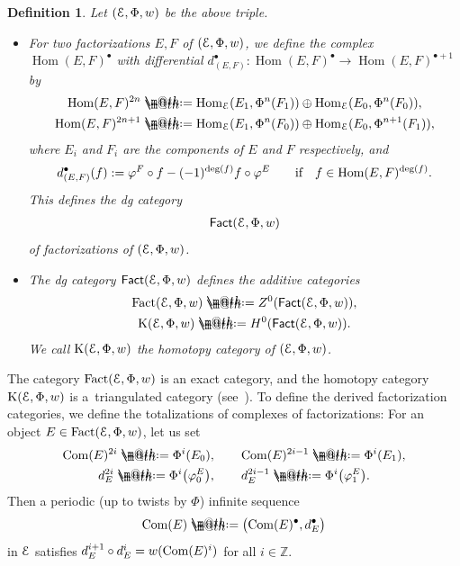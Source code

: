 \documentclass[pdftex]{sigma}%
\makeatletter
\newtheorem{dfn}{Definition}[section]
\newcommand*{\defeq}{\mathrel{\rlap{%
 \raisebox{0.3ex}{$\m@th\cdot$}}%
 \raisebox{-0.3ex}{$\m@th\cdot$}}%
 =}
\numberwithin{equation}{section}
\newcommand{\Fact}{\operatorname{Fact}}
\newcommand{\dgFact}{\operatorname{\sf{Fact}}}
\newcommand{\Hom}{\operatorname{Hom}}
\newcommand{\K}{\operatorname{K}}
\newcommand{\bZ}{\mathbb{Z}}
\newcommand{\scrE}{\EuScript{E}}
\makeatother
\begin{document}
\begin{dfn}
Let $(\scrE,\Phi,w)$ be the above triple.
\begin{itemize}\itemsep=0pt
\item[$1.$] For two factorizations $E,F$ of $(\scrE,\Phi,w)$, we define the complex $\Hom(E,F)^{\bullet}$ with differential $d^{\bullet}_{(E,F)}\colon\Hom(E,F)^{\bullet}\to\Hom(E,F)^{\bullet+1}$ by
\begin{gather*}
{\rm Hom}(E,F)^{2n}\defeq{\rm Hom}_{\scrE}(E_1,\Phi^n(F_1))\oplus{\rm Hom}_{\scrE}(E_0,\Phi^n(F_0)),
\\
{\rm Hom}(E,F)^{2n+1}\defeq{\rm Hom}_{\scrE}(E_1,\Phi^{n}(F_0))\oplus{\rm Hom}_{\scrE}(E_0,\Phi^{n+1}(F_1)),
\end{gather*}
where $E_i$ and $F_i$ are the components of $E$ and $F$ respectively, and
\begin{gather*}
d^{\bullet}_{(E,F)}(f):=\varphi^F\circ f-(-1)^{{\rm deg}(f)}f\circ \varphi^E
\qquad\text{if}\quad f\in{\rm Hom}(E,F)^{{\rm deg}(f)}.
\end{gather*}
This defines the dg category
\begin{gather*}
\dgFact(\scrE,\Phi,w)
\end{gather*}
of factorizations of $(\scrE,\Phi,w)$.

\item[$2.$] The dg category $\dgFact(\scrE,\Phi,w)$ defines the additive categories
\begin{gather*}
\Fact(\scrE,\Phi,w)\defeq Z^0(\dgFact(\scrE,\Phi,w)),
\\
\K(\scrE,\Phi,w)\defeq H^0(\dgFact(\scrE,\Phi,w)).
\end{gather*}
We call $\K(\scrE,\Phi,w)$ the {\it homotopy category} of $(\scrE,\Phi,w)$.
\end{itemize}
\end{dfn}

The category $\Fact(\scrE,\Phi,w)$ is an exact category, and the homotopy category $\K(\scrE,\Phi,w)$ is a~triangulated category (see~\cite[Propositions~3.5 and~3.9]{H1}). To define the derived factorization categories, we define the totalizations of complexes of factorizations: For an object $E\in \Fact(\scrE,\Phi,w)$, let us set
\begin{gather*}
{\rm Com}(E)^{2i}\defeq\Phi^i(E_0), \qquad {\rm Com}(E)^{2i-1}\defeq\Phi^i(E_1),
\\
d_E^{2i}\defeq\Phi^i\big(\varphi_0^E\big),\qquad d_E^{2i-1}\defeq\Phi^i\big(\varphi_1^E\big).
\end{gather*}
Then a periodic (up to twists by $\Phi$) infinite sequence
\begin{gather*}
{\rm Com}(E)\defeq\big({\rm Com}(E)^{\bullet}, d_E^{\bullet}\big)
\end{gather*}
 in $\scrE$ satisfies $d_E^{i+1}\circ d_E^i=w({\rm Com}(E)^i)$ for all $i\in\bZ$.
\end{document}
